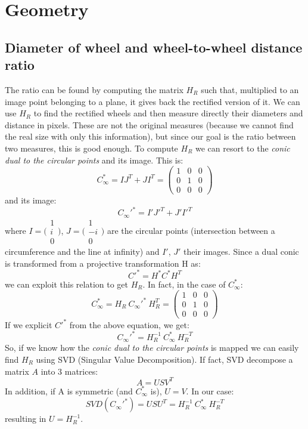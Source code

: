 \documentclass{article}
\begin{document}
\newpage
\section{Geometry}
\subsection{Diameter of wheel and wheel-to-wheel distance ratio}
The ratio can be found by computing the matrix $H_R$ such that, multiplied to an image point belonging to a plane, it gives back the rectified version of it. We can use $H_R$ to find the rectified wheels and then measure directly their diameters and distance in pixels. These are not the original measures (because we cannot find the real size with only this information), but since our goal is the ratio between two measures, this is good enough.
To compute $H_R$ we can resort to the \textit{conic dual to the circular points} and its image. This is:
$$ C_\infty^* = IJ^T + JI^T = \begin{pmatrix}
1 & 0 & 0 \\
0 & 1 & 0 \\
0 & 0 & 0
\end{pmatrix}
$$
and its image:
\begin{equation}
C_\infty'^* = I'J'^T + J'I'^T
\end{equation}
where $I = \bigl(\begin{smallmatrix}1 \\ i \\ 0 \end{smallmatrix} \bigr)$, $J = \bigl(\begin{smallmatrix}1 \\ -i \\ 0 \end{smallmatrix} \bigr)$ are the circular points (intersection between a circumference and the line at infinity) and $I'$, $J'$ their images.
Since a dual conic is transformed from a projective transformation H as:
$$ C'^* = H^* C^* H^T $$
we can exploit this relation to get $H_R$. In fact, in the case of $C_\infty^*$:
$$ C_\infty^* = H_R \: C_\infty'^* \: H_R^T = \begin{pmatrix}
1 & 0 & 0 \\
0 & 1 & 0 \\
0 & 0 & 0
\end{pmatrix}$$
If we explicit $C'^*$ from the above equation, we get:
\begin{equation}
C_\infty'^* = H_R^{-1} \: C_\infty^* \: H_R^{-T}
\end{equation}
So, if we know how the \textit{conic dual to the circular points} is mapped we can easily find $H_R$ using SVD (Singular Value Decomposition).
If fact, SVD decompose a matrix $A$ into 3 matrices:
$$ A = USV^T $$
In addition, if A is symmetric (and $C_\infty^*$ is), $U=V$. In our case:
$$ SVD(C_\infty'^*) = USU^T = H_R^{-1} \: C_\infty^* \: H_R^{-T} $$
resulting in $U=H_R^{-1}$.
\end{document}
